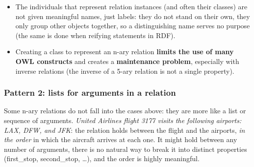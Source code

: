 \begin{center}
\end{center}

\begin{nbwarning}
\begin{itemize}[nosep]
  \item The individuals that represent relation instances (and often their classes) are
        not given meaningful names, just labels: they do not stand on their own, they
        only group other objects together, so a distinguishing name serves no purpose
        (the same is done when reifying statements in RDF).
  \item Creating a class to represent an n-ary relation \textbf{limits the use of many
        OWL constructs} and creates a \textbf{maintenance problem}, especially with
        inverse relations (the inverse of a 5-ary relation is not a single property).
\end{itemize}
\end{nbwarning}

\subsubsection{Pattern 2: lists for arguments in a relation}

Some n-ary relations do not fall into the cases above: they are more like a list or
sequence of arguments. \emph{United Airlines flight 3177 visits the following airports:
LAX, DFW, and JFK}: the relation holds between the flight and the airports, \emph{in the
order} in which the aircraft arrives at each one. It might hold between any number of
arguments, there is no natural way to break it into distinct properties (first\_stop,
second\_stop, \ldots), and the order is highly meaningful.

